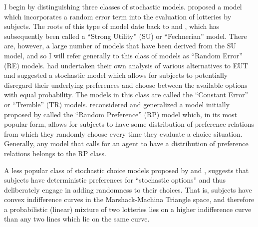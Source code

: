 \documentclass[../main.tex]{subfiles}
\begin{document}
I begin by distinguishing three classes of stochastic models.
\textcite[1301]{Hey1994} proposed a model which incorporates a random error term into the evaluation of lotteries by subjects.
The roots of this type of model date back to \textcite{Fechner1966} and \textcite{Luce1959}, which has subsequently been called a \enquote{Strong Utility} (SU) or \enquote{Fechnerian} model.
There are, however, a large number of models that have been derived from the SU model, and so I will refer generally to this class of models as \enquote{Random Error} (RE) models.
\textcite{Harless1994} had undertaken their own analysis of various alternatives to EUT and suggested a stochastic model which allows for subjects to potentially disregard their underlying preferences and choose between the available options with equal probability.
The models in this class are called the \enquote{Constant Error} or \enquote{Tremble} (TR) models.
\textcite{Loomes1995} reconsidered and generalized a model initially proposed by \textcite{Becker1963} called the \enquote{Random Preference} (RP) model which, in its most popular form, allows for subjects to have some distribution of preference relations from which they randomly choose every time they evaluate a choice situation.
Generally, any model that calls for an agent to have a distribution of preference relations belongs to the RP class.{\footnotemark}

\addtocounter{footnote}{-1}

A less popular class of stochastic choice models proposed by \textcite{Machina1985} and \textcite{Chew1991}, suggests that subjects have deterministic preferences for \enquote{stochastic options} and thus deliberately engage in adding randomness to their choices.
That is, subjects have convex indifference curves in the Marshack-Machina Triangle space,{\footnotemark} and therefore a probabilistic (linear) mixture of two lotteries lies on a higher indifference curve than any two lines which lie on the same curve.
\end{document}
